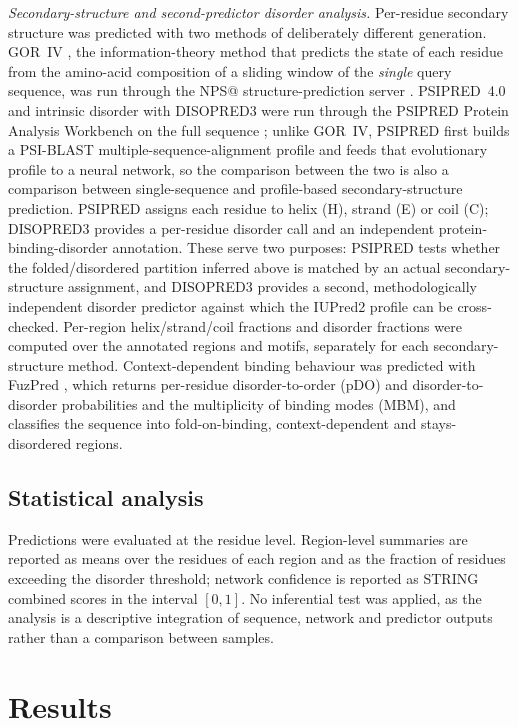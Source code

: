\documentclass[11pt]{article}
\begin{document}
\textit{Secondary-structure and second-predictor disorder analysis.} Per-residue secondary structure was predicted with two methods of deliberately different generation. GOR~IV \citep{garnier1996}, the information-theory method that predicts the state of each residue from the amino-acid composition of a sliding window of the \textit{single} query sequence, was run through the NPS@ structure-prediction server \citep{combet2000}. PSIPRED~4.0 and intrinsic disorder with DISOPRED3 were run through the PSIPRED Protein Analysis Workbench on the full sequence \citep{buchan2019,jones2015}; unlike GOR~IV, PSIPRED first builds a PSI-BLAST multiple-sequence-alignment profile and feeds that evolutionary profile to a neural network, so the comparison between the two is also a comparison between single-sequence and profile-based secondary-structure prediction. PSIPRED assigns each residue to helix (H), strand (E) or coil (C); DISOPRED3 provides a per-residue disorder call and an independent protein-binding-disorder annotation. These serve two purposes: PSIPRED tests whether the folded/disordered partition inferred above is matched by an actual secondary-structure assignment, and DISOPRED3 provides a second, methodologically independent disorder predictor against which the IUPred2 profile can be cross-checked. Per-region helix/strand/coil fractions and disorder fractions were computed over the annotated regions and motifs, separately for each secondary-structure method. Context-dependent binding behaviour was predicted with FuzPred \citep{miskei2020,horvath2020}, which returns per-residue disorder-to-order (pDO) and disorder-to-disorder probabilities and the multiplicity of binding modes (MBM), and classifies the sequence into fold-on-binding, context-dependent and stays-disordered regions.

\subsection{Statistical analysis}
Predictions were evaluated at the residue level. Region-level summaries are reported as means over the residues of each region and as the fraction of residues exceeding the disorder threshold; network confidence is reported as STRING combined scores in the interval $[0,1]$. No inferential test was applied, as the analysis is a descriptive integration of sequence, network and predictor outputs rather than a comparison between samples.

\section{Results}
\end{document}
